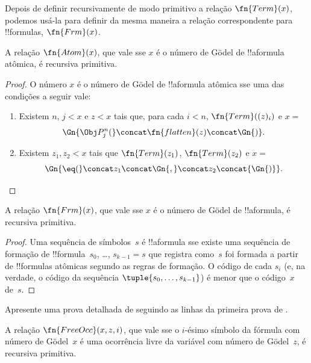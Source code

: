 \documentclass[../../../include/open-logic-section]{subfiles}
\begin{document}

Depois de definir recursivamente de modo primitivo a relação
$\fn{Term}(x)$, podemos usá-la para definir da mesma maneira a relação
correspondente para !!{formula}s, $\fn{Frm}(x)$.

\begin{prop}
A relação $\fn{Atom}(x)$, que vale sse $x$ é o número de G\"odel de
!!a{formula} atômica, é recursiva primitiva.
\end{prop}

\begin{proof}
O número $x$ é o número de G\"odel de !!a{formula} atômica sse uma das
condições a seguir vale:
\begin{enumerate}
\item Existem $n$, $j < x$ e $z < x$ tais que, para cada $i < n$,
  $\fn{Term}((z)_i)$ e $x = $
\[
\Gn{\Obj P^n_j(} \concat \fn{flatten}(z) \concat \Gn{)}.
\]
\item Existem $z_1, z_2 < x$ tais que $\fn{Term}(z_1)$,
  $\fn{Term}(z_2)$ e $x = $
\[
\Gn{{\eq}(} \concat z_1 \concat \Gn{,} \concat z_2 \concat{\Gn{)}}.
\]
\end{enumerate}
\end{proof}

\begin{prop}
A relação $\fn{Frm}(x)$, que vale sse $x$ é o número de G\"odel de
!!a{formula}, é recursiva primitiva.
\end{prop}

\begin{proof}
Uma sequência de símbolos~$s$ é !!a{formula} sse existe uma sequência
de formação de !!{formula}~$s_0$, \dots, $s_{k-1} = s$ que registra
como~$s$ foi formada a partir de !!{formula}s atômicas segundo as
regras de formação. O código de cada $s_i$ (e, na verdade, o código da
sequência $\tuple{s_0, \dots, s_{k-1}}$) é menor que o código~$x$
de~$s$.
\end{proof}

\begin{prob}
Apresente uma prova detalhada de
 seguindo as linhas da primeira
prova de .
\end{prob}

\begin{prop}
A relação $\fn{FreeOcc}(x, z, i)$, que vale sse o $i$-ésimo símbolo da
fórmula com número de G\"odel~$x$ é uma ocorrência livre da variável
com número de G\"odel~$z$, é recursiva primitiva.
\end{prop}
\end{document}
